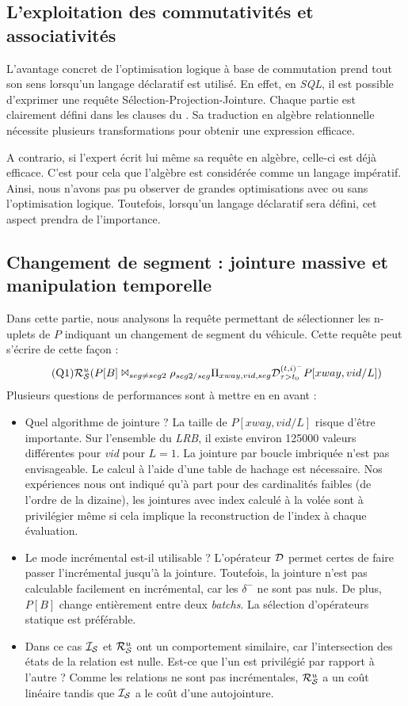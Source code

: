 \subsection{L'exploitation des commutativités et associativités}
L'avantage concret de l'optimisation logique à base de commutation prend tout son sens lorsqu'un langage déclaratif est utilisé. En effet, en \textit{SQL}, il est possible d'exprimer une requête Sélection-Projection-Jointure. Chaque partie est clairement défini dans les clauses du . Sa traduction en algèbre relationnelle nécessite plusieurs transformations pour obtenir une expression efficace.

A contrario, si l'expert écrit lui même sa requête en algèbre, celle-ci est déjà efficace. C'est pour cela que l'algèbre est considérée comme un langage impératif. Ainsi, nous n'avons pas pu observer de grandes optimisations avec ou sans l'optimisation logique. Toutefois, lorsqu'un langage déclaratif sera défini, cet aspect prendra de l'importance.

\subsection{Changement de segment : jointure massive et manipulation temporelle}
Dans cette partie, nous analysons la requête permettant de sélectionner les n-uplets de $P$ indiquant un changement de segment du véhicule. Cette requête peut s'écrire de cette façon : 
\begin{equation}
  \tag{Q1}
\mathcal{R}_{\mathcal S}^{u}(P[B] \Join_{seg\neq seg2} \rho_{seg2/seg} \Pi_{xway,vid,seg} \mathcal{D}^{(t,i)^-}_{\tau>t_0} P[xway,vid/L])
\end{equation}
Plusieurs questions de performances sont à mettre en en avant :
\begin{itemize}
	\item Quel algorithme de jointure ? La taille de $P[xway,vid/L]$ risque d'être importante. Sur l'ensemble du \textit{LRB}, il existe environ 125000 valeurs différentes pour \textit{vid} pour $L=1$. La jointure par boucle imbriquée n'est pas envisageable. Le calcul à l'aide d'une table de hachage est nécessaire. Nos expériences nous ont indiqué qu'à part pour des cardinalités faibles (de l'ordre de la dizaine), les jointures avec index calculé à la volée sont à privilégier même si cela implique la reconstruction de l'index à chaque évaluation.
	\item Le mode incrémental est-il utilisable ? L'opérateur $\mathcal{D}$ permet certes de faire passer l'incrémental jusqu'à la jointure. Toutefois, la jointure n'est pas calculable facilement en incrémental, car les $\delta^-$ ne sont pas nuls. De plus, $P[B]$ change entièrement entre deux \textit{batchs}. La sélection d'opérateurs statique est préférable.
	\item Dans ce cas $\mathcal{I_S}$ et $\mathcal{R}_{\mathcal S}^{u}$ ont un comportement similaire, car l'intersection des états de la relation est nulle. Est-ce que l'un est privilégié par rapport à l'autre ? Comme les relations ne sont pas incrémentales, $\mathcal{R}_{\mathcal S}^{u}$ a un coût linéaire tandis que $\mathcal{I_S}$ a le coût d'une autojointure.
\end{itemize}

